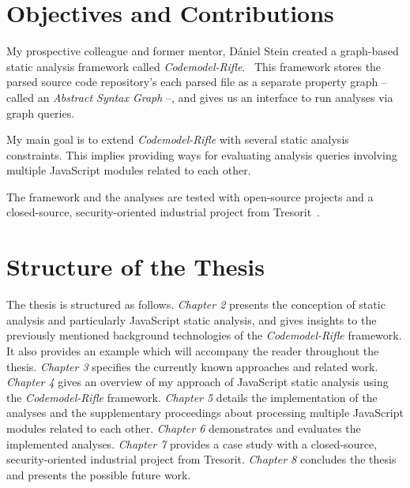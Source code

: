 \section{Objectives and Contributions}

My prospective colleague and former mentor, Dániel Stein created a graph-based static analysis framework called \emph{Codemodel-Rifle}.~\cite{stein-daniel-msc} This framework stores the parsed source code repository's each parsed file as a separate property graph – called an \emph{Abstract Syntax Graph} –, and gives us an interface to run analyses via graph queries.

My main goal is to extend \emph{Codemodel-Rifle} with several static analysis constraints. This implies providing ways for evaluating analysis queries involving multiple JavaScript modules related to each other.

The framework and the analyses are tested with open-source projects and a closed-source, security-oriented industrial project from Tresorit~\cite{tresorit}.


\section{Structure of the Thesis}

The thesis is structured as follows. \emph{Chapter 2} presents the conception of static analysis and particularly JavaScript static analysis, and gives insights to the previously mentioned background technologies of the \emph{Codemodel-Rifle} framework. It also provides an example which will accompany the reader throughout the thesis. \emph{Chapter 3} specifies the currently known approaches and related work. \emph{Chapter 4} gives an overview of my approach of JavaScript static analysis using the \emph{Codemodel-Rifle} framework. \emph{Chapter 5} details the implementation of the analyses and the supplementary proceedings about processing multiple JavaScript modules related to each other. \emph{Chapter 6} demonstrates and evaluates the implemented analyses. \emph{Chapter 7} provides a case study with a closed-source, security-oriented industrial project from Tresorit. \emph{Chapter 8} concludes the thesis and presents the possible future work.

